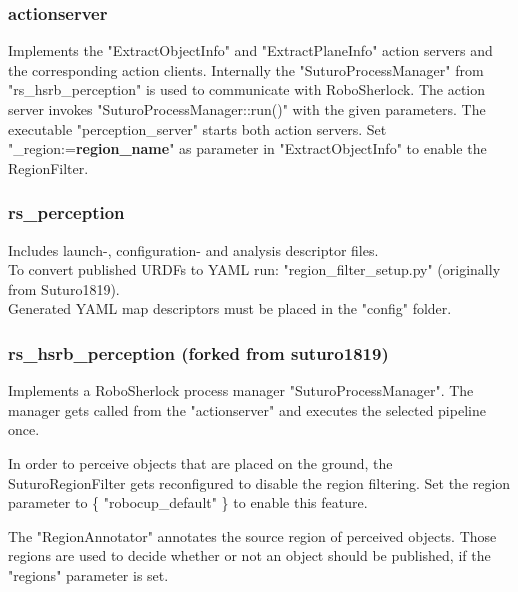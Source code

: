 \documentclass[main.tex]{subfiles}
\begin{document}
			\subsubsection{actionserver}
			Implements the "ExtractObjectInfo" and "ExtractPlaneInfo" action servers and the corresponding action clients.
			Internally the "SuturoProcessManager" from "rs\_hsrb\_perception" is used to communicate with RoboSherlock.
			The action server invokes "SuturoProcessManager::run()" with the given parameters.
			The executable "perception\_server" starts both action servers.
			Set "\_region:=\textbf{region\_name}" as parameter in "ExtractObjectInfo" to enable the RegionFilter.

			\subsubsection{rs\_perception}
			Includes launch-, configuration- and analysis descriptor files.\\
			To convert published URDFs to YAML run: "region\_filter\_setup.py" (originally from Suturo1819).\\
			Generated YAML map descriptors must be placed in the "config" folder.

			\subsubsection{rs\_hsrb\_perception (forked from suturo1819)}
			Implements a RoboSherlock process manager "SuturoProcessManager".
			The manager gets called from the "actionserver" and executes the selected pipeline once.

			In order to perceive objects that are placed on the ground, the SuturoRegionFilter gets reconfigured
			to disable the region filtering. Set the region parameter to \{ "robocup\_default" \} to enable this feature.

			The "RegionAnnotator" annotates the source region of perceived objects. Those regions are used
			to decide whether or not an object should be published, if the "regions" parameter is set.
\end{document}
